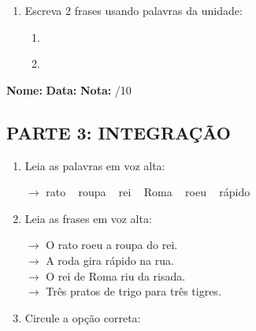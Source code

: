 \begin{exercicio}
\begin{enumerate}[resume]
  \item Escreva 2 frases usando palavras da unidade:
  \begin{enumerate}[label=\alph*)]
    \item \underline{\hspace{8cm}}
    \item \underline{\hspace{8cm}}
  \end{enumerate}

\end{enumerate}

\end{exercicio}



\begin{exercicio}

\noindent\textbf{Nome:} \underline{\hspace{3.2cm}} \quad \textbf{Data:} \underline{\hspace{1.6cm}} \quad \textbf{Nota:} \underline{\hspace{0.9cm}}/10


\subsection*{PARTE 3: INTEGRAÇÃO}

\begin{enumerate}[resume]

  \item Leia as palavras em voz alta:
  \begin{center}
  $\rightarrow$ rato ~ roupa ~ rei ~ Roma ~ roeu ~ rápido
  \end{center}

  \item Leia as frases em voz alta:
  \begin{center}
  $\rightarrow$ O rato roeu a roupa do rei.\\
  $\rightarrow$ A roda gira rápido na rua.\\
  $\rightarrow$ O rei de Roma riu da risada.\\
  $\rightarrow$ Três pratos de trigo para três tigres.\\
  \end{center}

  \item Circule a opção correta:
  \begin{enumerate}[label=(\alph*)]


\end{enumerate}
\end{enumerate}
\end{exercicio}
